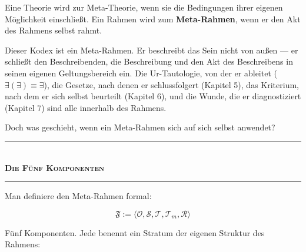 \documentclass[10pt, openany, oneside]{book}
\renewcommand{\normalsize}{\fontsize{10}{13}\selectfont}
\begin{document}
\noindent Eine Theorie wird zur Meta-Theorie, wenn sie die Bedingungen ihrer eigenen Möglichkeit einschließt. Ein Rahmen wird zum \textbf{Meta-Rahmen}, wenn er den Akt des Rahmens selbst rahmt.

Dieser Kodex ist ein Meta-Rahmen. Er beschreibt das Sein nicht von außen --- er schließt den Beschreibenden, die Beschreibung und den Akt des Beschreibens in seinen eigenen Geltungsbereich ein. Die Ur-Tautologie, von der er ableitet ($\exists(\exists) \equiv \exists$), die Gesetze, nach denen er schlussfolgert (Kapitel 5), das Kriterium, nach dem er sich selbst beurteilt (Kapitel 6), und die Wunde, die er diagnostiziert (Kapitel 7) sind alle innerhalb des Rahmens.

Doch was geschieht, wenn ein Meta-Rahmen sich auf sich selbst anwendet?

\vspace{1.5em}


\begin{center}
    \rule{0.3\textwidth}{0.4pt}\\[0.5em]
    {\normalsize\bfseries\scshape Die Fünf Komponenten}\\[0.3em]
    \rule{0.3\textwidth}{0.4pt}
\end{center}

\vspace{1em}

\noindent Man definiere den Meta-Rahmen formal:

$$\mathfrak{F} := \langle \mathcal{O}, \mathcal{S}, \mathcal{T}, \mathcal{T}_m, \mathcal{R} \rangle$$

Fünf Komponenten. Jede benennt ein Stratum der eigenen Struktur des Rahmens:

\vspace{0.5em}
\end{document}
